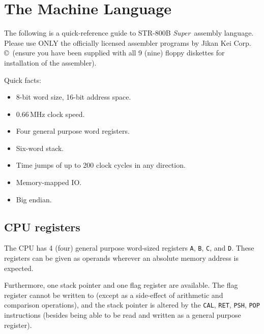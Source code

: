 \documentclass[a5paper,onecolumn,final,10pt]{memoir}
\newcommand\machinename%
	{\textsf{STR-800B \textit{Super}}}
\newcommand\companyname%
	{Jikan Kei Corp.\,\copyright}
\begin{document}



\clearpage
\section{The Machine Language}

The following is a quick-reference guide to \machinename\ assembly language. Please use ONLY the officially licensed assembler programs by \companyname\ (ensure you have been supplied with all 9 (nine) floppy diskettes for installation of the assembler). 


Quick facts:
\begin{itemize}[nosep]
	\item 8-bit word size, 16-bit address space. 
	\item 0.66\,MHz clock speed. 
	\item Four general purpose word registers.
	\item Six-word stack. 
	\item Time jumps of up to 200 clock cycles in any direction.\footnotemark
	\item Memory-mapped IO. 
	\item Big endian. 
\end{itemize}

\subsection*{CPU registers}

The CPU has 4 (four) general purpose word-sized registers \texttt{A}, \texttt{B}, \texttt{C}, and \texttt{D}. 
These registers can be given as operands wherever an absolute memory address is expected. 

Furthermore, one stack pointer and one flag register are available. 
The flag register cannot be written to (except as a side-effect of arithmetic and comparison operations), 
and the stack pointer is altered by the \texttt{CAL}, \texttt{RET}, \texttt{PSH}, \texttt{POP} instructions 
(besides being able to be read and written as a general purpose register). 
\end{document}
